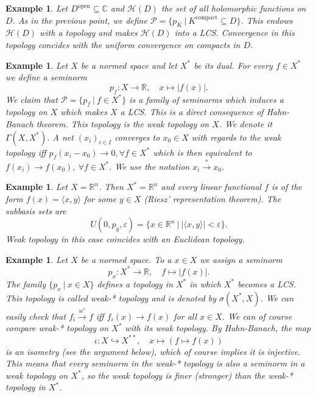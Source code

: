 \documentclass[10pt, a4paper]{article}
\newtheorem{example}[thm]{Example}
\newcommand{\R}{\mathbb {R}}
\newcommand{\C}{\mathbb {C}}
\begin{document}
\begin{example}
        Let $D^{\textrm{open}} \subseteq \C$ and $\mathcal{H} (D)$ the set of all holomorphic functions on $D$.
        As in the previous point, we define $\mathcal{P} = \{p_K\ |\ K^{\textrm{compact}} \subseteq D\}$.
        This endows $\mathcal{H}(D)$ with a topology and makes $\mathcal{H}(D)$ into a LCS.
        Convergence in this topology concides with the uniform convergence on compacts in $D$.            
\end{example} 
        
\begin{example}
    Let $X$ be a normed space and let $X^*$ be its dual. For every $f \in X^*$ we define a seminorm 
        $$p_f: X \to \R,\quad x \mapsto |f(x)|.$$
        We claim that $\mathcal{P} = \{p_f\ |\ f \in X^*\}$ is a family of seminorms which induces a topology on $X$ which makes $X$ a LCS. This is a direct consequence of Hahn-Banach theorem.
        This topology is the weak topology on $X$. We denote it $\Gamma(X, X^*)$. A net $(x_i)_{i \in I}$ converges to $x_0 \in X$ with regards to the weak topology
        iff $p_f (x_i - x_0) \to 0,\forall f \in X^*$ which is then equivalent to $f(x_i) \to f(x_0),\ \forall f \in X^*.$
        We use the notation $x_i \xrightarrow{*} x_0$.
\end{example}

\begin{example}
  Let $X = \R^n$. Then $X^* = \R^n$ and every linear functional $f$ is of the form 
$f(x) = \langle x, y \rangle$ for some $y \in X$ (Riesz' representation theorem). The subbasis sets are
$$U(0, p_y, \varepsilon) = \{x \in \R^n\ |\ |\langle x, y\rangle| < \varepsilon\}.$$
Weak topology in this case coincides with an Euclidean topology.
\end{example} 

\begin{example}
    Let $X$ be a normed space. To a $x \in X$ we assign a seminorm $$p_x: X^* \to \R,\quad f \mapsto |f(x)|.$$
    The family $\{p_x\ |\ x \in X\}$ defines a topology in $X^*$ in which $X^*$ becomes a LCS.
    This topology is called weak-* topology and is denoted by $\sigma (X^*, X)$.
    We can easily check that $f_i \xrightarrow{w^*} f$ iff $f_i (x) \to f(x)$ for all $x \in X$.
    We can of course compare weak-* topology on $X^*$ with its weak topology.
    By Hahn-Banach, the map $$\iota: X \hookrightarrow X^{**},\quad x \mapsto (f \mapsto f(x))$$
    is an isometry (see the argument below), which of course implies it is injective. This means that every seminorm in the weak-* topology is also 
    a seminorm in a weak topology on $X^*$, so the weak topology is finer (stronger) than the weak-* topology in $X^*$.
\end{example}
\end{document}
